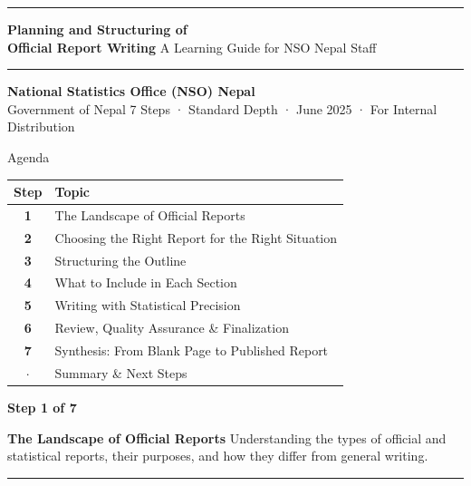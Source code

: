 \documentclass[xcolor={table,dvipsnames},aspectratio=169,11pt]{beamer}
\newcommand{\stepbadge}[1]{%
    \begin{tcolorbox}[colback=nsoGold,colframe=nsoGold,arc=8pt,auto outer arc,
        halign=center,valign=center,width=2.5cm,boxrule=0pt,top=2pt,bottom=2pt,left=2pt,right=2pt]
        \color{white}\tiny\bfseries #1
    \end{tcolorbox}%
}
\begin{document}
{
\begin{frame}[plain]
    \vspace{0.8cm}
    \textcolor{nsoGold}{\rule{3cm}{4pt}}
    \vskip 0.4cm
    {\color{white}\huge\bfseries Planning and Structuring of\\Official Report Writing}
    \vskip 0.2cm
    {\color{nsoLight}\Large A Learning Guide for NSO Nepal Staff}
    \vskip 0.4cm
    \textcolor{nsoGold}{\rule{3cm}{4pt}}
    \vskip 0.4cm
    {\color{white}\bfseries National Statistics Office (NSO) Nepal} \\
    {\color{nsoLight}\small Government of Nepal}
    \vskip 0.8cm
    {\color{nsoMid}\tiny 7 Steps · Standard Depth · June 2025 · For Internal Distribution}
\end{frame}
}

{
\begin{frame}{Agenda}
    \centering
    \small
    \begin{tabular}{cl}
    \toprule
    \rowcolor{nsoBlue}\color{white}\bfseries Step & \color{white}\bfseries Topic \\
    \midrule
    \textbf{1} & The Landscape of Official Reports \\
    \textbf{2} & Choosing the Right Report for the Right Situation \\
    \textbf{3} & Structuring the Outline \\
    \textbf{4} & What to Include in Each Section \\
    \textbf{5} & Writing with Statistical Precision \\
    \textbf{6} & Review, Quality Assurance \& Finalization \\
    \textbf{7} & Synthesis: From Blank Page to Published Report \\
    $\cdot$ & Summary \& Next Steps \\
    \bottomrule
    \end{tabular}
\end{frame}
}

{
\begin{frame}[plain]
    \vspace{1.5cm}
    \stepbadge{Step 1 of 7}
    \vskip 0.4cm
    {\color{white}\LARGE\bfseries The Landscape of Official Reports}
    \vskip 0.4cm
    {\color{nsoLight}\large Understanding the types of official and statistical reports, their purposes, and how they differ from general writing.}
    \vskip 0.8cm
    \textcolor{nsoGold}{\rule{3cm}{3pt}}
\end{frame}
}
\end{document}
